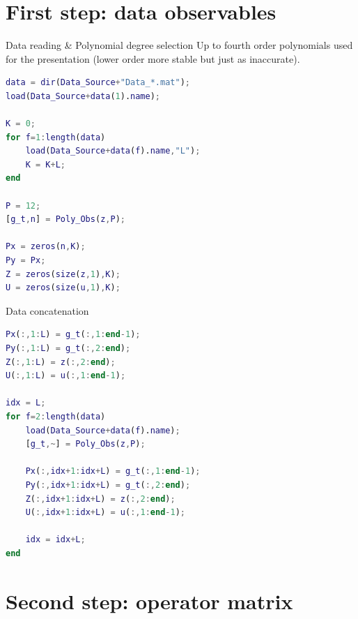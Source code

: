 \documentclass{beamer}
\begin{document}
\section{First step: data observables}

\begin{frame}[fragile]{Data reading \& Polynomial degree selection}
    Up to fourth order polynomials used for the presentation (lower order more stable but just as inaccurate).

    \begin{lstlisting}[language=Matlab, basicstyle=\tiny]
data = dir(Data_Source+"Data_*.mat");
load(Data_Source+data(1).name);

K = 0;
for f=1:length(data)
    load(Data_Source+data(f).name,"L");
    K = K+L;
end

P = 12;
[g_t,n] = Poly_Obs(z,P);

Px = zeros(n,K);
Py = Px;
Z = zeros(size(z,1),K);
U = zeros(size(u,1),K);
    \end{lstlisting}
\end{frame}

\begin{frame}[fragile]{Data concatenation}
    \begin{lstlisting}[language=Matlab]
Px(:,1:L) = g_t(:,1:end-1);
Py(:,1:L) = g_t(:,2:end);
Z(:,1:L) = z(:,2:end);
U(:,1:L) = u(:,1:end-1);

idx = L;
for f=2:length(data)
    load(Data_Source+data(f).name);
    [g_t,~] = Poly_Obs(z,P);

    Px(:,idx+1:idx+L) = g_t(:,1:end-1);
    Py(:,idx+1:idx+L) = g_t(:,2:end);
    Z(:,idx+1:idx+L) = z(:,2:end);
    U(:,idx+1:idx+L) = u(:,1:end-1);

    idx = idx+L;
end
    \end{lstlisting}
\end{frame}


\section{Second step: operator matrix}
\end{document}
